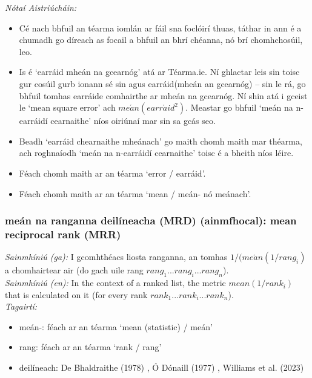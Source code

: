  \noindent \textit{Nótaí Aistriúcháin:}
\begin{itemize}
	\item Cé nach bhfuil an téarma iomlán ar fáil sna foclóirí thuas, táthar in ann é a chumadh go díreach as focail a bhfuil an bhrí chéanna, nó brí chomhchosúil, leo.
	\item Is é `earráid mheán na gcearnóg' atá ar Téarma.ie. Ní ghlactar leis sin toisc gur cosúil gurb ionann sé sin agus earráid(mheán an gcearnóg) -- sin le rá, go bhfuil tomhas earráide comhairthe ar mheán na gcearnóg. Ní shin atá i gceist le `mean square error' ach $me\acute{a}n(earr\acute{a}id^2)$. Meastar go bhfuil `meán na n-earráidí cearnaithe' níos oiriúnaí mar sin sa gcás seo.
	\item Beadh `earráid chearnaithe mheánach' go maith chomh maith mar théarma, ach roghnaíodh `meán na n-earráidí cearnaithe' toisc é a bheith níos léire.
	\item Féach chomh maith ar an téarma `error / earráid'.
	\item Féach chomh maith ar an téarma `mean / meán- nó meánach'.
\end{itemize}


\subsubsection*{meán na ranganna deilíneacha (MRD) (ainmfhocal): mean reciprocal rank (MRR)}
 \noindent \textit{Sainmhíniú (ga):} I gcomhthéacs liosta ranganna, an tomhas $1 / (me\acute{a}n(1 / rang_i)$ a chomhairtear air (do gach uile rang $rang_1...rang_i...rang_n$).
\\
 \noindent \textit{Sainmhíniú (en):} In the context of a ranked list, the metric $mean(1 / rank_i)$ that is calculated on it (for every rank $rank_1...rank_i...rank_n$).
\\
 \noindent \textit{Tagairtí:}
\begin{itemize}
	\item meán-: féach ar an téarma `mean (statistic) / meán'
	\item rang: féach ar an téarma `rank / rang'
	\item deilíneach: De Bhaldraithe (1978) \cite{de-bhaldraithe}, Ó Dónaill (1977) \cite{odonaill}, Williams et al. (2023) \cite{storchiste}
\end{itemize}

